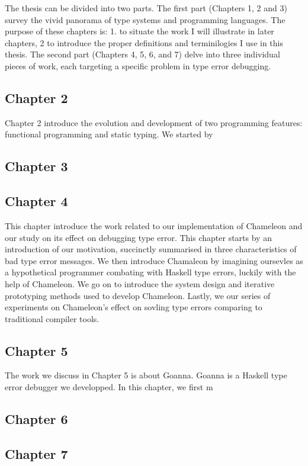 The thesis can be divided into two parts. The first part (Chapters 1, 2 and 3) survey the vivid panorama of type systems and programming languages. The purpose of these chapters is: 1. to situate the work I will illustrate in later chapters, 2 to introduce the proper definitions and terminilogies I use in this thesis.  The second part (Chapters 4, 5, 6, and 7) delve into three individual pieces of work, each targeting a specific problem in type error debugging.


\subsection{Chapter 2}

Chapter 2 introduce the evolution and development of two programming features: functional programming and static typing. We started by 


\subsection{Chapter 3}

\subsection{Chapter 4}
This chapter introduce the work related to our implementation of Chameleon and our study on its effect on debugging type error. This chapter starts by an introduction of our motivation, succinctly summarised in three characteristics of bad type error messages. We then introduce Chamaleon by imagining oursevles as a hypothetical programmer combating with Haskell type errors, luckily with the help of Chameleon. We go on to introduce the system design and iterative prototyping methods used to develop Chameleon. Lastly, we our series of experiments on Chameleon's effect on sovling type errors comparing to traditional compiler tools. 


\subsection{Chapter 5}

The work we discuss in Chapter 5 is about Goanna. Goanna is a Haskell type error debugger we developped. In this chapter, we first m

\subsection{Chapter 6}

\subsection{Chapter 7}
